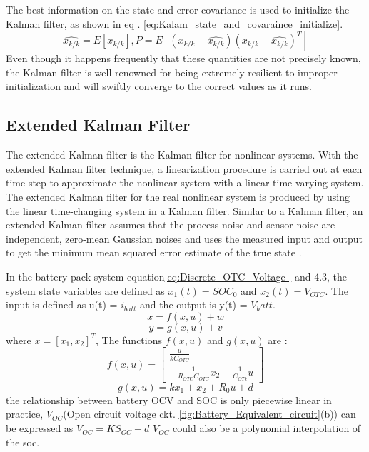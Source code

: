 The best information on the state and error covariance is used to initialize the Kalman filter, as shown in eq . \ref{eq:Kalam_state_and_covaraince_initialize}.
\begin{equation}\label{eq:Kalam_state_and_covaraince_initialize}
    \hat{x_{k/k}} = E[x_{k/k}], P = E[(x_{k/k} - \hat{x_{k/k}})(x_{k/k} - \hat{x_{k/k}})^T]
\end{equation}
Even though it happens frequently that these quantities are not precisely known, the Kalman filter is well renowned for being extremely resilient to improper initialization and will swiftly converge to the correct values as it runs.


\subsection{Extended Kalman Filter}

The extended Kalman filter is the Kalman filter for nonlinear systems. With the extended Kalman filter technique, a linearization procedure is carried out at each time step to approximate the nonlinear system with a linear time-varying system. The extended Kalman filter for the real nonlinear system is produced by using the linear time-changing system in a Kalman filter. Similar to a Kalman filter, an extended Kalman filter assumes that the process noise and sensor noise are independent, zero-mean Gaussian noises and uses the measured input and output to get the minimum mean squared error estimate of the true state \cite{ADIJ_MARTIN2017}.

In the battery pack system equation\ref{eq:Discrete_OTC_Voltage } and 4.3, the system state variables are defined as $x_1(t) = SOC_0$ and $x_2(t) = V_{OTC}$. The input is defined as u(t) = $i_{batt}$ and the output is y(t) = $V_batt$. 
\begin{equation}
    \dot{x}  = f(x,u) + w
\end{equation}
\begin{equation}
    y  = g(x,u) + v
\end{equation}
where $x = [x_1,x_2]^T$, The functions $f(x,u)$  and $g(x,u)$ are :
\begin{equation}\label{eq:Batt_Kalman_State_function}
    f(x,u) =  \begin{bmatrix}
                    \frac{u}{k C_{OTC}} \\
                    -\frac{1}{R_{OTC} C_{OTC}} x_2 + \frac{1}{C_{OTc}} u
               \end{bmatrix}  
\end{equation}
\begin{equation}\label{eq:Batt_Kalaman_output_function}
    g(x,u) = k x_1 + x_2  + R_0 u + d
\end{equation}
the relationship between battery OCV and SOC is only piecewise 
linear in practice, $V_{OC}$(Open circuit voltage ckt. \ref{fig:Battery_Equivalent_circuit}(b)) can be expressed as 
$V_{OC} = K S_{OC} + d$
$V_{OC}$ could also be a polynomial interpolation of the soc.\\

